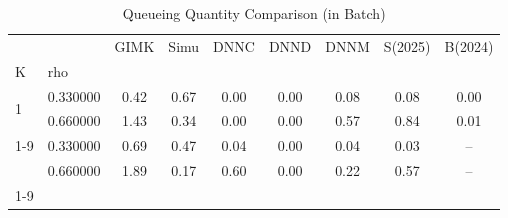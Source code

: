 \begin{table}
\caption{Queueing Quantity Comparison (in Batch)}
\label{tab:queue_comp}
\begin{tabular}{llccccccc}
\toprule
 &  & GIMK & Simu & DNNC & DNND & DNNM & S(2025) & B(2024) \\
K & rho &  &  &  &  &  &  &  \\
\midrule
\multirow[t]{2}{*}{1} & 0.330000 & 0.42 & 0.67 & 0.00 & 0.00 & 0.08 & 0.08 & 0.00 \\
 & 0.660000 & 1.43 & 0.34 & 0.00 & 0.00 & 0.57 & 0.84 & 0.01 \\
\cline{1-9}
\multirow[t]{2}{*}{2} & 0.330000 & 0.69 & 0.47 & 0.04 & 0.00 & 0.04 & 0.03 & -- \\
 & 0.660000 & 1.89 & 0.17 & 0.60 & 0.00 & 0.22 & 0.57 & -- \\
\cline{1-9}
\bottomrule
\end{tabular}
\end{table}
